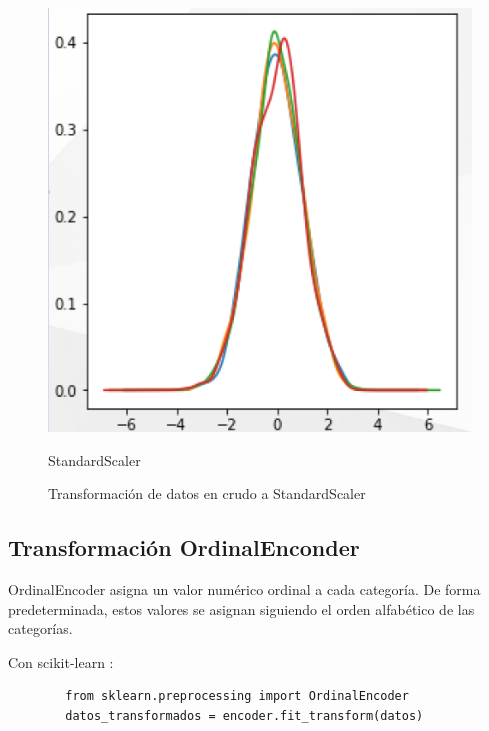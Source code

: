 \begin{figure}[h!]
\begin{minipage}{0.45\textwidth}
        \includegraphics[width=\linewidth]{Imagenes/StandarNormalizado.PNG}
        \caption{StandardScaler}
        \label{fig:figura2}
    \end{minipage}
    \caption{Transformación de datos en crudo a StandardScaler}
    \label{fig:crudoAstandar}
\end{figure}

\subsection{Transformación OrdinalEnconder}

OrdinalEncoder asigna un valor numérico ordinal a cada categoría. De forma predeterminada, 
estos valores se asignan siguiendo el orden alfabético de las categorías. \medskip

Con scikit-learn : \medskip

\begin{tcolorbox}[colback=gray!30, coltext=black, colframe=black, boxrule=0.5mm, width=\textwidth]
    \begin{verbatim}
        from sklearn.preprocessing import OrdinalEncoder
        datos_transformados = encoder.fit_transform(datos)
    \end{verbatim}
\end{tcolorbox}

